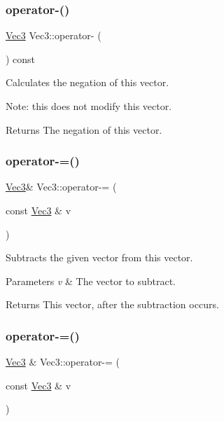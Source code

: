 \subsubsection{\texorpdfstring{operator-\/()}{operator-()}\hspace{0.1cm}{\footnotesize\ttfamily [4/4]}}
{\footnotesize\ttfamily \hyperlink{classVec3}{Vec3} Vec3\+::operator-\/ (\begin{DoxyParamCaption}{ }\end{DoxyParamCaption}) const\hspace{0.3cm}{\ttfamily [inline]}}

Calculates the negation of this vector.

Note\+: this does not modify this vector.

\begin{DoxyReturn}{Returns}
The negation of this vector. 
\end{DoxyReturn}
\mbox{\label{classVec3_a56e2011901279dc8a4da44218abde10a}} 
\subsubsection{\texorpdfstring{operator-\/=()}{operator-=()}\hspace{0.1cm}{\footnotesize\ttfamily [1/2]}}
{\footnotesize\ttfamily \hyperlink{classVec3}{Vec3}\& Vec3\+::operator-\/= (\begin{DoxyParamCaption}\item[{const \hyperlink{classVec3}{Vec3} \&}]{v }\end{DoxyParamCaption})\hspace{0.3cm}{\ttfamily [inline]}}

Subtracts the given vector from this vector.


\begin{DoxyParams}{Parameters}
{\em v} & The vector to subtract. \\
\hline
\end{DoxyParams}
\begin{DoxyReturn}{Returns}
This vector, after the subtraction occurs. 
\end{DoxyReturn}
\mbox{\label{classVec3_af1d77e8543bd887b509dc74379b8cc30}} 
\subsubsection{\texorpdfstring{operator-\/=()}{operator-=()}\hspace{0.1cm}{\footnotesize\ttfamily [2/2]}}
{\footnotesize\ttfamily \hyperlink{classVec3}{Vec3} \& Vec3\+::operator-\/= (\begin{DoxyParamCaption}\item[{const \hyperlink{classVec3}{Vec3} \&}]{v }\end{DoxyParamCaption})\hspace{0.3cm}{\ttfamily [inline]}}

